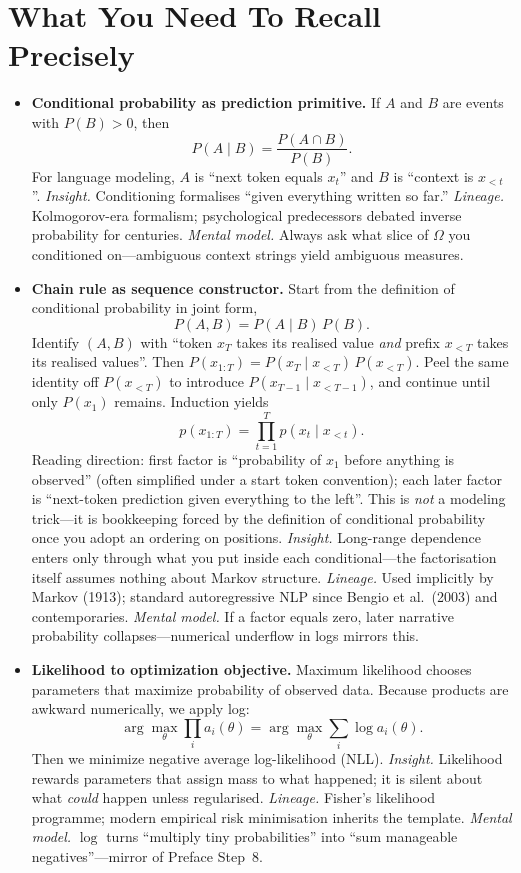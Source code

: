 \section*{What You Need To Recall Precisely}
\begin{itemize}[leftmargin=1.5em]
  \item \textbf{Conditional probability as prediction primitive.} If $A$ and $B$ are events with $P(B)>0$, then
  \[
    P(A\mid B)=\frac{P(A\cap B)}{P(B)}.
  \]
  For language modeling, $A$ is ``next token equals $x_t$'' and $B$ is ``context is $x_{<t}$''.
  \textit{Insight.} Conditioning formalises ``given everything written so far.''
  \textit{Lineage.} Kolmogorov-era formalism; psychological predecessors debated inverse probability for centuries.
  \textit{Mental model.} Always ask what slice of $\Omega$ you conditioned on---ambiguous context strings yield ambiguous measures.

  \item \textbf{Chain rule as sequence constructor.}
  Start from the definition of conditional probability in joint form,
  \[
    P(A,B)=P(A\mid B)\,P(B).
  \]
  Identify $(A,B)$ with ``token $x_T$ takes its realised value \emph{and} prefix $x_{<T}$ takes its realised values''. Then $P(x_{1:T})=P(x_T\mid x_{<T})\,P(x_{<T})$. Peel the same identity off $P(x_{<T})$ to introduce $P(x_{T-1}\mid x_{<T-1})$, and continue until only $P(x_1)$ remains. Induction yields
  \[
    p(x_{1:T}) = \prod_{t=1}^{T} p(x_t \mid x_{<t}).
  \]
  Reading direction: first factor is ``probability of $x_1$ before anything is observed'' (often simplified under a start token convention); each later factor is ``next-token prediction given everything to the left''. This is \emph{not} a modeling trick---it is bookkeeping forced by the definition of conditional probability once you adopt an ordering on positions.
  \textit{Insight.} Long-range dependence enters only through what you put inside each conditional---the factorisation itself assumes nothing about Markov structure.
  \textit{Lineage.} Used implicitly by Markov (1913); standard autoregressive NLP since Bengio et al.\ (2003) and contemporaries.
  \textit{Mental model.} If a factor equals zero, later narrative probability collapses---numerical underflow in logs mirrors this.

  \item \textbf{Likelihood to optimization objective.} Maximum likelihood chooses parameters that maximize probability of observed data. Because products are awkward numerically, we apply log:
  \[
    \arg\max_\theta \prod_i a_i(\theta)=\arg\max_\theta \sum_i \log a_i(\theta).
  \]
  Then we minimize negative average log-likelihood (NLL).
  \textit{Insight.} Likelihood rewards parameters that assign mass to what happened; it is silent about what \emph{could} happen unless regularised.
  \textit{Lineage.} Fisher's likelihood programme; modern empirical risk minimisation inherits the template.
  \textit{Mental model.} $\log$ turns ``multiply tiny probabilities'' into ``sum manageable negatives''---mirror of Preface Step~8.


\end{itemize}
